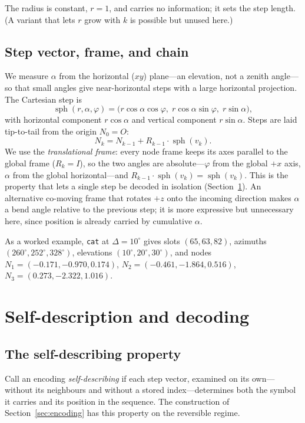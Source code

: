 \documentclass[11pt]{article}
\newcommand{\sph}{\operatorname{sph}}
\renewcommand{\deg}{^{\circ}}  %
\begin{document}
The radius is constant, $r=1$, and carries no information; it sets the step length. (A
variant that lets $r$ grow with $k$ is possible but unused here.)

\subsection{Step vector, frame, and chain}\label{sec:frame}

We measure $\alpha$ from the horizontal ($xy$) plane---an elevation, not a zenith angle---so
that small angles give near-horizontal steps with a large horizontal projection. The
Cartesian step is
\[
  \sph(r,\alpha,\varphi) = \bigl(r\cos\alpha\cos\varphi,\; r\cos\alpha\sin\varphi,\;
  r\sin\alpha\bigr),
\]
with horizontal component $r\cos\alpha$ and vertical component $r\sin\alpha$. Steps are laid
tip-to-tail from the origin $N_0 = O$:
\[
  N_k = N_{k-1} + R_{k-1}\cdot \sph(v_k).
\]
We use the \emph{translational frame}: every node frame keeps its axes parallel to the global
frame ($R_k = I$), so the two angles are absolute---$\varphi$ from the global $+x$ axis,
$\alpha$ from the global horizontal---and $R_{k-1}\cdot\sph(v_k) = \sph(v_k)$. This is the
property that lets a single step be decoded in isolation (Section~\ref{sec:selfdesc}). An
alternative co-moving frame that rotates $+z$ onto the incoming direction makes $\alpha$ a
bend angle relative to the previous step; it is more expressive but unnecessary here, since
position is already carried by cumulative $\alpha$.

As a worked example, \texttt{cat} at $\Delta=10\deg$ gives slots $(65,63,82)$, azimuths
$(260\deg,252\deg,328\deg)$, elevations $(10\deg,20\deg,30\deg)$, and nodes
$N_1=(-0.171,-0.970,0.174)$, $N_2=(-0.461,-1.864,0.516)$, $N_3=(0.273,-2.322,1.016)$.

\section{Self-description and decoding}\label{sec:selfdesc}

\subsection{The self-describing property}\label{sec:selfprop}

Call an encoding \emph{self-describing} if each step vector, examined on its own---without
its neighbours and without a stored index---determines both the symbol it carries and its
position in the sequence. The construction of Section~\ref{sec:encoding} has this property on
the reversible regime.
\end{document}
